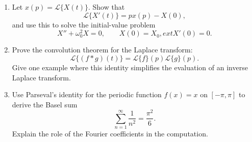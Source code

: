 \begin{enumerate}
    \item\label{ex:laplace-derivative} Let $x(p)=\mathcal{L}\{X(t)\}$. Show that
    \begin{equation*}
        \mathcal{L}\{X'(t)\}=p x(p)-X(0),
    \end{equation*}
    and use this to solve the initial-value problem
    \begin{equation*}
        X''+\omega_0^2X=0,
        \qquad X(0)=X_0,	ext{ }X'(0)=0.
    \end{equation*}

    \item\label{ex:laplace-convolution} Prove the convolution theorem for the Laplace transform:
    \begin{equation*}
        \mathcal{L}\{(f*g)(t)\}=\mathcal{L}\{f\}(p)\mathcal{L}\{g\}(p).
    \end{equation*}
    Give one example where this identity simplifies the evaluation of an inverse Laplace transform.

    \item\label{ex:basel-series} Use Parseval's identity for the periodic function $f(x)=x$ on $[-\pi,\pi]$ to derive the Basel sum
    \begin{equation*}
        \sum_{n=1}^{\infty}\frac{1}{n^2}=\frac{\pi^2}{6}.
    \end{equation*}
    Explain the role of the Fourier coefficients in the computation.
\end{enumerate}
